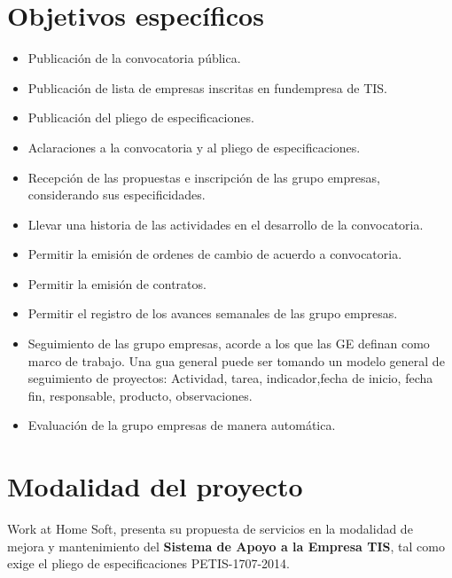 \documentclass[11pt,letterpaper]{report}
\begin{document}
\section{Objetivos específicos}
\begin{itemize}
 	\item Publicación de la convocatoria pública.
	\item Publicación de lista de empresas inscritas en fundempresa de TIS.
	\item Publicación del pliego de especificaciones.
	\item Aclaraciones a la convocatoria y al pliego de especificaciones.
	\item Recepción de las propuestas e inscripción de las grupo empresas, considerando sus especificidades.
	\item Llevar una historia de las actividades en el desarrollo de la convocatoria.
	\item Permitir la emisión de  ordenes de cambio de acuerdo a convocatoria.
	\item Permitir la emisión de contratos.
	\item Permitir el registro de los avances semanales de las grupo empresas.
	\item Seguimiento de las grupo empresas, acorde a los que las GE definan como marco de trabajo. Una gua general puede ser tomando un modelo general de seguimiento de proyectos: Actividad, tarea, indicador,fecha de inicio, fecha fin, responsable, producto, observaciones.
	\item Evaluación de la grupo empresas de manera automática.
\end{itemize}
\section{Modalidad del proyecto}
Work at Home Soft, presenta su propuesta de servicios en la modalidad de mejora y mantenimiento del {\bf Sistema de Apoyo a la Empresa TIS}, tal como exige el pliego de especificaciones PETIS-1707-2014.
\end{document}
